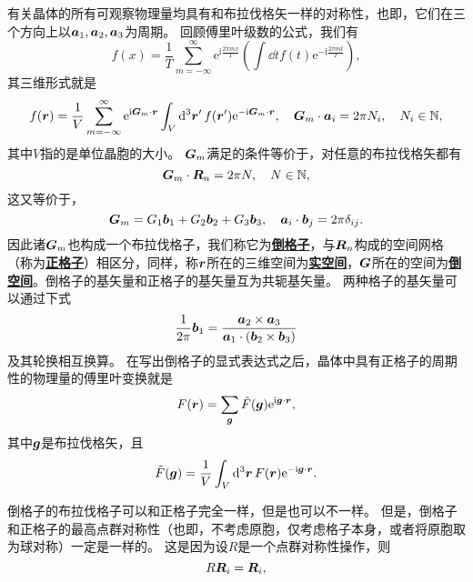 \documentclass[hyperref, UTF8, a4paper]{ctexart}
\newcommand*{\ii}{\mathrm{i}}
\newcommand*{\ee}{\mathrm{e}}
\newcommand*{\concept}[1]{\underline{\textbf{#1}}}
\begin{document}
有关晶体的所有可观察物理量均具有和布拉伐格矢一样的对称性，也即，它们在三个方向上以$\vb*{a}_1,\vb*{a}_2,\vb*{a}_3$为周期。
回顾傅里叶级数的公式，我们有
\[
    f(x) = \frac{1}{T} \sum_{m=-\infty}^\infty \ee^{\ii \frac{2\pi m x}{T}} \left(\int \dd{t} f(t) \ee^{-\ii \frac{2\pi m t}{T}}\right) ,
\]
其三维形式就是
\[
    f(\vb*{r}) = \frac{1}{V} \sum_{m=-\infty}^\infty \ee^{\ii \vb*{G}_m \cdot \vb*{r}} \int_V \dd[3]{\vb*{r}'} f(\vb*{r}') \ee^{- \ii \vb*{G}_m \cdot \vb*{r}}, \quad \vb*{G}_m \cdot \vb*{a}_i = 2\pi N_i, \quad N_i \in \mathbb{N},
\]
其中$V$指的是单位晶胞的大小。
$\vb*{G}_m$满足的条件等价于，对任意的布拉伐格矢都有
\begin{equation}
    \vb*{G}_m \cdot \vb*{R}_n = 2\pi N, \quad N \in \mathbb{N},
\end{equation}
这又等价于，
\begin{equation}
    \vb*{G}_m = G_1 \vb*{b}_1 + G_2 \vb*{b}_2 + G_3 \vb*{b}_3, \quad \vb*{a}_i \cdot \vb*{b}_j = 2 \pi \delta_{ij}.
\end{equation}
因此诸$\vb*{G}_m$也构成一个布拉伐格子，我们称它为\concept{倒格子}，与$\vb*{R}_n$构成的空间网格（称为\concept{正格子}）相区分，同样，称$\vb*{r}$所在的三维空间为\concept{实空间}，$\vb*{G}$所在的空间为\concept{倒空间}。倒格子的基矢量和正格子的基矢量互为共轭基矢量。
两种格子的基矢量可以通过下式
\begin{equation}
    \frac{1}{2\pi} \vb*{b}_1 = \frac{\vb*{a}_2 \times \vb*{a}_3}{\vb*{a}_1 \cdot (\vb*{b}_2 \times \vb*{b}_3)}
\end{equation}
及其轮换相互换算。
在写出倒格子的显式表达式之后，晶体中具有正格子的周期性的物理量的傅里叶变换就是
\begin{equation}
    F(\vb*{r}) = \sum_{\vb*{g}} \tilde{F}(\vb*{g}) \ee^{\ii \vb*{g} \cdot \vb*{r}},
\end{equation}
其中$\vb*{g}$是布拉伐格矢，且
\begin{equation}
    \tilde{F}(\vb*{g}) = \frac{1}{V} \int_V \dd[3]{\vb*{r}} F(\vb*{r}) \ee^{-\ii \vb*{g} \cdot \vb*{r}}.
\end{equation}

倒格子的布拉伐格子可以和正格子完全一样，但是也可以不一样。
但是，倒格子和正格子的最高点群对称性（也即，不考虑原胞，仅考虑格子本身，或者将原胞取为球对称）一定是一样的。
这是因为设$R$是一个点群对称性操作，则
\[
    R \vb*{R}_i = \vb*{R}_i,
\]
\end{document}
